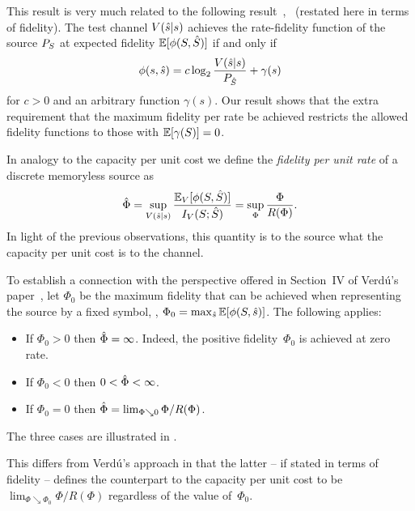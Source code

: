 \begin{remark}
  \label{rem:tcontc2}
  This result is very much related to the following result~\cite[Section~2.3,
  Problem~3]{CsiszarK1981},~\cite{GastparRV2003} (restated here in terms of
  fidelity). The test channel $V({\hat{s}}|s)$
  achieves the rate-fidelity function of the source ${P_S}$ at expected
  fidelity $\mathbb{E}[\phi(S,{\hat{S}})]$ if and only if
  \[ \phi(s,{\hat{s}}) = c \log_2 \frac{V({\hat{s}}|s)}{{P_{\hat{S}}}} + \gamma(s) \]
  for $c > 0$ and an arbitrary function $\gamma(s)$. Our result shows that the
  extra requirement that the maximum fidelity per rate be achieved restricts the
  allowed fidelity functions to those with $\mathbb{E}[\gamma(S)] = 0$.
\end{remark}



In analogy to the capacity per unit cost we define the \emph{fidelity per unit
rate} of a discrete memoryless source as
\[ {\hat{\Phi}} = \sup_{V({\hat{s}}|s)} \frac{{\mathbb{E}_V}[\phi(S,{\hat{S}})]}{I_V(S;{\hat{S}})} =  \sup_{\Phi}
\frac{\Phi}{R(\Phi)}. \]
In light of the previous observations, this quantity is to the source what the
capacity per unit cost is to the channel. 

\begin{remark}\label{rem:verduphi}
  To establish a connection with the perspective offered in Section~IV of
  Verd\'u's paper~\cite{Verdu1990}, let $\Phi_0$ be the maximum fidelity that
  can be achieved when representing the source by a fixed symbol, \ie, $\Phi_0 =
  \max_{{\hat{s}}} \mathbb{E}[\phi(S, {\hat{s}})]$. The following applies:
\begin{itemize}
  \item If $\Phi_0 > 0$ then ${\hat{\Phi}} = \infty$. Indeed, the positive
    fidelity~$\Phi_0$ is achieved at zero rate.
  \item If $\Phi_0 < 0$ then $0 < {\hat{\Phi}} < \infty$. 
  \item If $\Phi_0 = 0$ then ${\hat{\Phi}} = \lim_{\Phi \searrow 0} \Phi /
    R(\Phi)$. 
\end{itemize}
The three cases are illustrated in .

This differs from Verd\'u's approach in that the latter -- if stated in terms of
fidelity -- defines the counterpart to the capacity per unit cost to be
$\lim_{\Phi \searrow \Phi_0} \Phi / R(\Phi)$ regardless of the value
of~$\Phi_0$. 
\end{remark}

